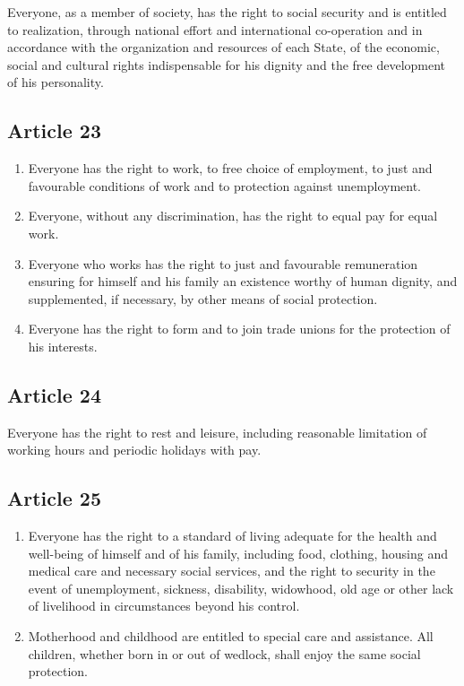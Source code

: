 \documentclass[
  ngerman,
  american,
  titlepage,
  openright,
  DIV=calc,
  toc=listof,
  listof=nochaptergap]{scrbook}
\begin{document}
Everyone, as a member of society, has the right to social security and
is entitled to realization, through national effort and international
co-operation and in accordance with the organization and resources of
each State, of the economic, social and cultural rights indispensable
for his dignity and the free development of his personality.

\subsection{Article 23}\label{article-23}

\begin{enumerate}
\def\labelenumi{\arabic{enumi}.}
\item
  Everyone has the right to work, to free choice of employment, to just
  and favourable conditions of work and to protection against
  unemployment.
\item
  Everyone, without any discrimination, has the right to equal pay for
  equal work.
\item
  Everyone who works has the right to just and favourable remuneration
  ensuring for himself and his family an existence worthy of human
  dignity, and supplemented, if necessary, by other means of social
  protection.
\item
  Everyone has the right to form and to join trade unions for the
  protection of his interests.
\end{enumerate}

\subsection{Article 24}\label{article-24}

Everyone has the right to rest and leisure, including reasonable
limitation of working hours and periodic holidays with pay.

\subsection{Article 25}\label{article-25}

\begin{enumerate}
\def\labelenumi{\arabic{enumi}.}
\item
  Everyone has the right to a standard of living adequate for the health
  and well-being of himself and of his family, including food, clothing,
  housing and medical care and necessary social services, and the right
  to security in the event of unemployment, sickness, disability,
  widowhood, old age or other lack of livelihood in circumstances beyond
  his control.
\item
  Motherhood and childhood are entitled to special care and assistance.
  All children, whether born in or out of wedlock, shall enjoy the same
  social protection.
\end{enumerate}
\end{document}
